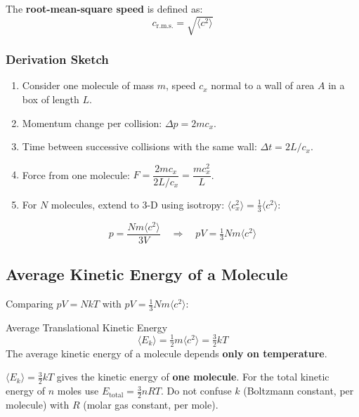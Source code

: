 The \textbf{root-mean-square speed} is defined as:
\begin{equation}
  c_{\mathrm{r.m.s.}} = \sqrt{\langle c^2 \rangle}
\end{equation}

\subsubsection{Derivation Sketch}
\begin{enumerate}
  \item Consider one molecule of mass $m$, speed $c_x$ normal to a wall of area $A$
        in a box of length $L$.
  \item Momentum change per collision: $\Delta p = 2mc_x$.
  \item Time between successive collisions with the same wall: $\Delta t = 2L/c_x$.
  \item Force from one molecule: $F = \dfrac{2mc_x}{2L/c_x} = \dfrac{mc_x^2}{L}$.
  \item For $N$ molecules, extend to 3-D using isotropy:
        $\langle c_x^2 \rangle = \tfrac{1}{3}\langle c^2 \rangle$:
\end{enumerate}
\[
  p = \frac{Nm\langle c^2\rangle}{3V}
  \quad\Longrightarrow\quad
  pV = \tfrac{1}{3}Nm\langle c^2\rangle
\]

\subsection{Average Kinetic Energy of a Molecule}

Comparing $pV = NkT$ with $pV = \tfrac{1}{3}Nm\langle c^2\rangle$:

\begin{formulabox}{Average Translational Kinetic Energy}
\begin{equation}
  \langle E_k \rangle = \tfrac{1}{2}m\langle c^2\rangle = \tfrac{3}{2}kT
\end{equation}
The average kinetic energy of a molecule depends \textbf{only on temperature}.
\end{formulabox}

\begin{warnbox}
$\langle E_k \rangle = \tfrac{3}{2}kT$ gives the kinetic energy of \textbf{one
molecule}. For the total kinetic energy of $n$ moles use
$E_{\mathrm{total}} = \tfrac{3}{2}nRT$.
Do not confuse $k$ (Boltzmann constant, per molecule) with $R$ (molar gas constant,
per mole).
\end{warnbox}

